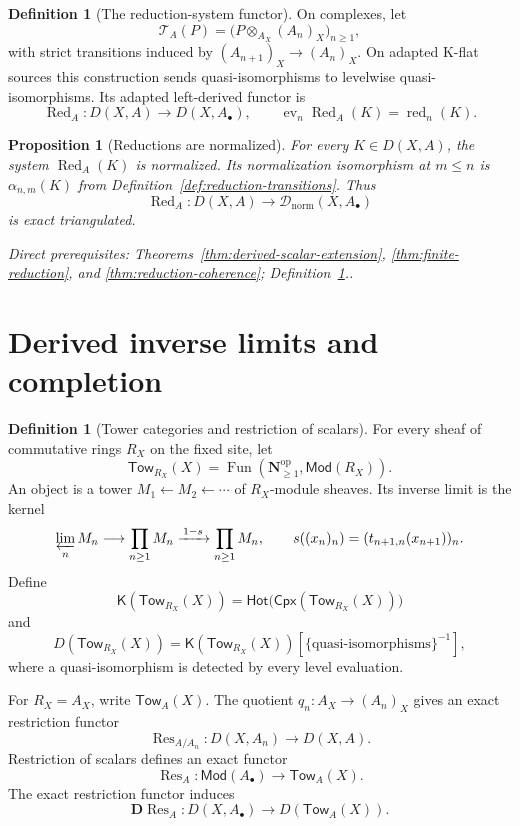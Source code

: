 \documentclass[10pt]{article}
\newtheorem{proposition}[theorem]{Proposition}
\theoremstyle{definition}
\newtheorem{definition}[theorem]{Definition}
\newcommand{\Dnorm}{\mathcal D_{\mathrm{norm}}}
\newcommand{\depends}[1]{\par\smallskip\noindent\textit{Direct prerequisites:} #1.}
\begin{document}
\begin{definition}[The reduction-system functor]\label{def:reduction-system}
On complexes, let
\[
 \mathcal T_A(P)=
 \bigl(P\otimes_{A_X}(A_n)_X\bigr)_{n\geq1},
\]
with strict transitions induced by $(A_{n+1})_X\to(A_n)_X$.  On adapted
K-flat sources this construction sends quasi-isomorphisms to levelwise
quasi-isomorphisms.  Its adapted left-derived functor is
\[
 \operatorname{Red}_A:D(X,A)\longrightarrow D(X,A_\bullet),
 \qquad
 \operatorname{ev}_n\operatorname{Red}_A(K)=\operatorname{red}_n(K).
\]
\end{definition}

\begin{proposition}[Reductions are normalized]\label{prop:reductions-normalized}
For every $K\in D(X,A)$, the system $\operatorname{Red}_A(K)$ is normalized.
Its normalization isomorphism at $m\leq n$ is
$\alpha_{n,m}(K)$ from Definition~\ref{def:reduction-transitions}.  Thus
\[
 \operatorname{Red}_A:D(X,A)\longrightarrow
      \Dnorm(X,A_\bullet)
\]
is exact triangulated.
\depends{Theorems~\ref{thm:derived-scalar-extension},
\ref{thm:finite-reduction}, and
\ref{thm:reduction-coherence}; Definition~\ref{def:reduction-system}.}
\end{proposition}

\section{Derived inverse limits and completion}

\begin{definition}[Tower categories and restriction of scalars]
\label{def:tower-category}
For every sheaf of commutative rings $R_X$ on the fixed site, let
\[
 \mathsf{Tow}_{R_X}(X)=
 \operatorname{Fun}(\mathbf N_{\geq1}^{\mathrm{op}},
                    \mathsf{Mod}(R_X)).
\]
An object is a tower $M_1\leftarrow M_2\leftarrow\cdots$ of $R_X$-module
sheaves.  Its inverse limit is the kernel
\[
 \varprojlim_nM_n\longrightarrow\prod_{n\geq1}M_n
 \xrightarrow{\,1-s\,}\prod_{n\geq1}M_n,
 \qquad s((x_n)_n)=(t_{n+1,n}(x_{n+1}))_n.
\]
Define
\[
 \mathsf K(\mathsf{Tow}_{R_X}(X))=
 \mathsf{Hot}\bigl(\mathsf{Cpx}(\mathsf{Tow}_{R_X}(X))\bigr)
\]
and
\[
 D(\mathsf{Tow}_{R_X}(X))=
 \mathsf K(\mathsf{Tow}_{R_X}(X))
 [\{\text{quasi-isomorphisms}\}^{-1}],
\]
where a quasi-isomorphism is detected by every level evaluation.

For $R_X=A_X$, write $\mathsf{Tow}_A(X)$.  The quotient $q_n:A_X\to(A_n)_X$
gives an exact restriction functor
\[
 \operatorname{Res}_{A/A_n}:D(X,A_n)\longrightarrow D(X,A).
\]
Restriction of scalars defines an exact functor
\[
 \operatorname{Res}_A:\mathsf{Mod}(A_\bullet)\longrightarrow
 \mathsf{Tow}_A(X).
\]
The exact restriction functor induces
\[
 \mathbf D\operatorname{Res}_A:D(X,A_\bullet)\longrightarrow
 D(\mathsf{Tow}_A(X)).
\]
\end{definition}
\end{document}
